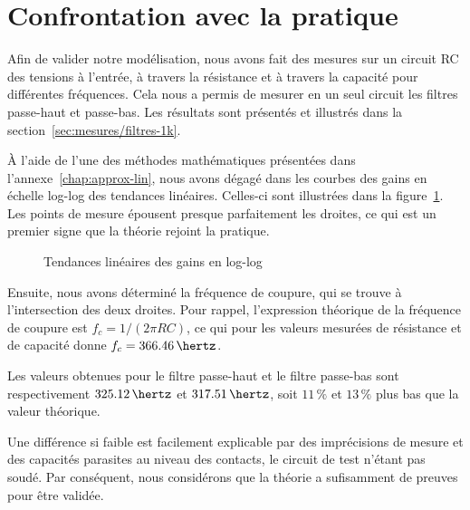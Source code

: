 \section{Confrontation avec la pratique}
\label{sec:filtres/confront}

Afin de valider notre modélisation,
nous avons fait des mesures sur un circuit RC
des tensions à l'entrée, à travers la résistance
et à travers la capacité pour différentes fréquences.
Cela nous a permis de mesurer en un seul circuit
les filtres passe-haut et passe-bas.
Les résultats sont présentés et illustrés
dans la section~\ref{sec:mesures/filtres-1k}.

À l'aide de l'une des méthodes mathématiques présentées dans
l'annexe~\ref{chap:approx-lin},
nous avons dégagé dans les courbes des gains en échelle log-log
des tendances linéaires.
Celles-ci sont illustrées dans la figure~\ref{fig:ph-pb-tendances}.
Les points de mesure épousent presque parfaitement les droites,
ce qui est un premier signe que la théorie rejoint la pratique.

\begin{figure}[h!]
    \centering
    \caption{Tendances linéaires des gains en log-log}
    \label{fig:ph-pb-tendances}
\end{figure}

Ensuite, nous avons déterminé la fréquence de coupure,
qui se trouve à l'intersection des deux droites.
Pour rappel, l'expression théorique de la fréquence de coupure est
$f_c=1/(2\pi RC)$, ce qui pour les valeurs mesurées de résistance et
de capacité donne $f_c=366.46\,\hertz$.

Les valeurs obtenues pour le filtre passe-haut et le filtre passe-bas
sont respectivement $325.12\,\hertz$ et $317.51\,\hertz$,
soit $11\,\%$ et $13\,\%$ plus bas que la valeur théorique.

Une différence si faible est facilement explicable par des imprécisions
de mesure et des capacités parasites au niveau des contacts,
le circuit de test n'étant pas soudé.
Par conséquent, nous considérons que la théorie a sufisamment de preuves
pour être validée.
